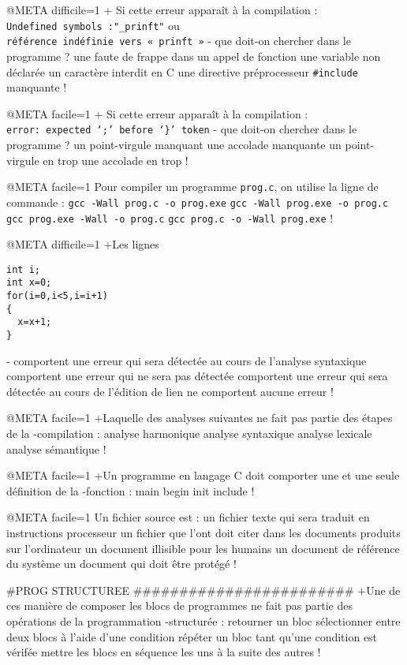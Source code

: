 @META difficile=1
+ Si cette erreur apparaît à la compilation : \\
 \verb+Undefined symbols :"_prinft"+ ou \\
 \verb+référence indéfinie vers « prinft »+
- que doit-on chercher dans le programme ?
  une faute de frappe dans un appel de fonction
  une variable non déclarée
  un caractère interdit en C
  une directive préprocesseur \verb+#include+ manquante
!




@META facile=1
+ Si cette erreur apparaît à la compilation : \\
\verb+error: expected ‘;’ before ‘}’ token+ 
- que doit-on chercher dans le programme ?
 un point-virgule manquant
 une accolade manquante
 un point-virgule en trop
 une accolade en trop
!

@META facile=1
Pour compiler un programme \verb|prog.c|, on utilise la ligne de commande : 
 \verb|gcc -Wall prog.c -o prog.exe|
 \verb|gcc -Wall prog.exe -o prog.c|
 \verb|gcc prog.exe -Wall -o prog.c|
 \verb|gcc prog.c -o -Wall prog.exe|
!

@META difficile=1
+Les lignes
\begin{verbatim}
int i;
int x=0;
for(i=0,i<5,i=i+1)
{
  x=x+1;
}
\end{verbatim}
-
 comportent une erreur qui sera détectée au cours de l'analyse syntaxique
 comportent une erreur qui ne sera pas détectée
 comportent une erreur qui sera détectée au cours de l'édition de lien
 ne comportent aucune erreur
!

@META facile=1
+Laquelle des analyses suivantes ne fait pas partie des étapes de la
-compilation :
 analyse harmonique
 analyse syntaxique
 analyse lexicale
 analyse sémantique
!

@META facile=1
+Un programme en langage C doit comporter une et une seule définition de la
-fonction :
 main
 begin
 init
 include
!

@META facile=1
Un fichier source est :
 un fichier texte qui sera traduit en instructions processeur
 un fichier que l'ont doit citer dans les documents produits sur l'ordinateur
 un document illisible pour les humains
 un document de référence du système
 un document qui doit être protégé
!

#PROG STRUCTUREE ########################
+Une de ces manière de composer les blocs de
programmes ne fait pas partie des opérations de la programmation
-structurée :
 retourner un bloc
 sélectionner entre deux blocs à l'aide d'une condition
 répéter un bloc tant qu'une condition est vérifée
 mettre les blocs en séquence les uns à la suite des autres
!

